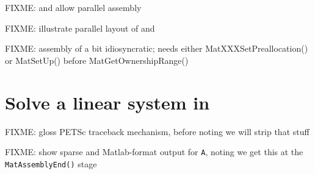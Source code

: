 FIXME: \pVec and \pMat allow parallel assembly

FIXME: illustrate parallel layout of \pVec and \pMat

FIXME: assembly of \pMat a bit idiosyncratic; needs either MatXXXSetPreallocation() or MatSetUp() before MatGetOwnershipRange()


\section{Solve a linear system in \PETSc}




FIXME: gloss PETSc traceback mechanism, before noting we will strip that stuff

FIXME: show sparse and Matlab-format output for \texttt{A}, noting we get this at the \texttt{MatAssemblyEnd()} stage %


